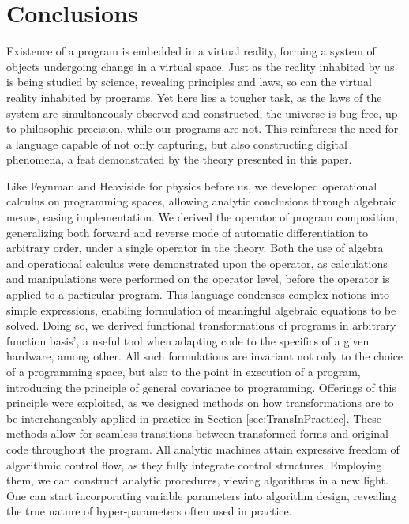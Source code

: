 \documentclass[smallcondensed]{svjour3}
\begin{document}
\section{Conclusions}

Existence of a program is embedded in a virtual reality, forming a system of objects undergoing change in a virtual space. Just as the reality inhabited by us is being studied by science, revealing principles and laws, so can the virtual reality inhabited by programs. Yet here lies a tougher task, as the laws of the system are simultaneously observed and constructed; the universe is bug-free, up to philosophic precision, while our programs are not. This reinforces the need for a language capable of not only capturing, but also constructing digital phenomena, a feat demonstrated by the theory presented in this paper. 

Like Feynman \cite{Feynman} and Heaviside \cite{HeavisideOperational} for physics before us, we developed operational calculus on programming spaces, allowing analytic conclusions through algebraic means, easing implementation. We derived the operator of program composition, generalizing both forward \cite{PcAD} and reverse \cite{ReverseAD} mode of automatic differentiation to arbitrary order, under a single operator in the theory. Both the use of algebra and operational calculus were demonstrated upon the operator, as calculations and manipulations were performed on the operator level, before the operator is applied to a particular program.
This language condenses complex notions into simple expressions, enabling formulation of meaningful algebraic equations to be solved. Doing so, we derived functional transformations of programs in arbitrary function basis', a useful tool when adapting code to the specifics of a given hardware, among other.
All such formulations are invariant not only to the choice of a programming space, but also to the point in execution of a program, introducing the principle of general covariance \cite{GeneralCovariance} to programming. Offerings of this principle were exploited, as we designed methods on how transformations are to be interchangeably applied in practice in Section \ref{sec:TransInPractice}. These methods allow for seamless transitions between transformed forms and original code throughout the program. All analytic machines attain expressive freedom of algorithmic control flow, as they fully integrate control structures. Employing them, we can construct analytic procedures, viewing algorithms in a new light. One can start incorporating variable parameters into algorithm design, revealing the true nature of hyper-parameters often used in practice.
\end{document}
